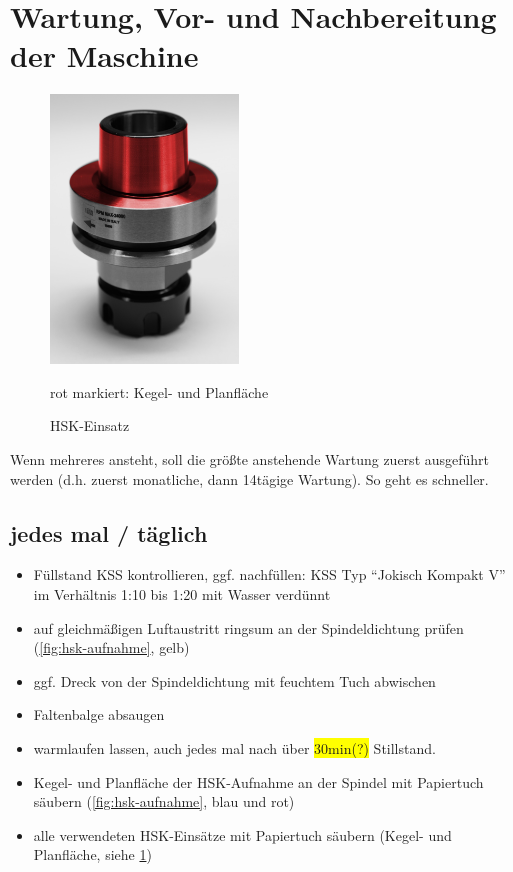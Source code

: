 \documentclass{\basedir/fablab-document}
\renewcommand{\todo}[1]{\colorbox{yellow}{{#1}}}
\begin{document}
\section{Wartung, Vor- und Nachbereitung der Maschine}
\begin{figure}
\centering
\includegraphics[width=5cm]{./img/hsk-einsatz.jpg}
\caption{HSK-Einsatz}
rot markiert: Kegel- und Planfläche
\label{fig:hsk-einsatz}
\end{figure}


Wenn mehreres ansteht, soll die größte anstehende Wartung zuerst ausgeführt werden (d.h. zuerst monatliche, dann 14tägige Wartung). So geht es schneller.

\subsection{jedes mal / täglich}
\begin{itemize}
	\item Füllstand KSS kontrollieren, ggf. nachfüllen: KSS Typ \enquote{Jokisch Kompakt V} im Verhältnis 1:10 bis 1:20 mit Wasser verdünnt
	\item auf gleichmäßigen Luftaustritt ringsum an der Spindeldichtung prüfen (\cref{fig:hsk-aufnahme}, gelb)
	\item ggf. Dreck von der Spindeldichtung mit feuchtem Tuch abwischen
	\item Faltenbalge absaugen
	\item warmlaufen lassen, auch jedes mal nach über \todo{30min(?)} Stillstand. %
	\item Kegel- und Planfläche der HSK-Aufnahme an der Spindel mit Papiertuch säubern (\cref{fig:hsk-aufnahme}, blau und rot)
	\item alle verwendeten HSK-Einsätze mit Papiertuch säubern (Kegel- und Planfläche, siehe \cref{fig:hsk-einsatz})
\end{itemize}
\end{document}

